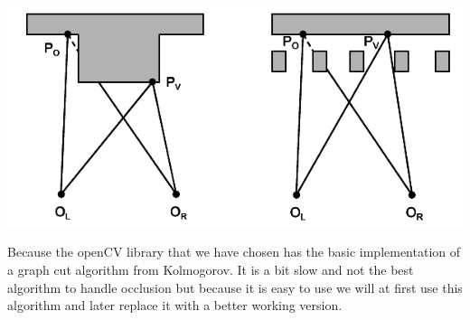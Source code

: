 \documentclass[12pt,draft,a4paper]{article}
\begin{document}
\includegraphics{matching_problems_occlusion}

Because the openCV library that we have chosen has the basic
implementation of a graph cut algorithm from Kolmogorov. It is a bit
slow and not the best algorithm to handle occlusion but because it is
easy to use we will at first use this algorithm and later replace it
with a better working version.


\end{document}
